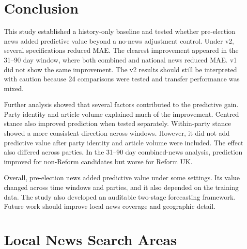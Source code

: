 \documentclass[final-report]{report-template}
\begin{document}
\section{Conclusion}
This study established a history-only baseline and tested whether pre-election news added predictive value beyond a no-news adjustment control. Under v2, several specifications reduced MAE. The clearest improvement appeared in the 31--90 day window, where both combined and national news reduced MAE. v1 did not show the same improvement. The v2 results should still be interpreted with caution because 24 comparisons were tested and transfer performance was mixed.

Further analysis showed that several factors contributed to the predictive gain. Party identity and article volume explained much of the improvement. Centred stance also improved prediction when tested separately. Within-party stance showed a more consistent direction across windows. However, it did not add predictive value after party identity and article volume were included. The effect also differed across parties. In the 31--90 day combined-news analysis, prediction improved for non-Reform candidates but worse for Reform UK.

Overall, pre-election news added predictive value under some settings. Its value changed across time windows and parties, and it also depended on the training data. The study also developed an auditable two-stage forecasting framework. Future work should improve local news coverage and geographic detail.







\clearpage
\printbibliography[title={References}]  %

\clearpage
\appendix

\clearpage
\section{Local News Search Areas}

\begin{table}[htbp]
  \centering
  
  \caption{The 17 Surrey electoral areas included in the local news search sample and their pre-registered selection reasons. Areas were selected across four electoral-structure categories: safe seats (2021 winning margin $\geq 20$ percentage points), marginal seats ($\leq 5$ percentage points), areas where the winning party changed between 2021 and 2026, and areas with the highest Reform UK vote shares in 2026. The top five areas in each category were selected and then deduplicated. The rules and thresholds were fixed before any news content was examined, and the selection used only publicly available election-result data. An area could satisfy more than one criterion.}
  \label{tab:a11-divisions}
\end{table}
\end{document}
